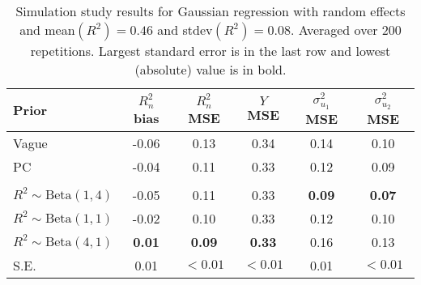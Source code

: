 \documentclass[12pt]{article}
\begin{document}
\begin{table}
\centering
    \begin{tabular}{l|ccccc}
        Prior & $R^2_n$ bias & $R^2_n$ MSE& $Y$ MSE &  $\sigma^2_{u_1}$ MSE & $\sigma^2_{u_2}$ MSE \\\hline

        Vague &  -0.06 &0.13 &0.34 &0.14 &0.10 \\
        PC &-0.04 &0.11 &0.33 &0.12 &0.09  \\
        &\vspace{-10pt}\\
        $R^2\sim\mbox{Beta}(1,4)$ &-0.05 &0.11 &0.33 &{\bf 0.09} &{\bf 0.07} \\
        $R^2\sim\mbox{Beta}(1,1)$&-0.02 &0.10 &0.33 &0.12 &0.10 \\
        $R^2\sim\mbox{Beta}(4,1)$ &{\bf 0.01} &{\bf 0.09} &{\bf 0.33} &0.16 &0.13    \\\hline
        S.E. & 0.01 & $<0.01$ & $<0.01$ & 0.01 & $<0.01$
    \end{tabular}
    \caption{Simulation study results for Gaussian regression with random effects and mean$(R^2)=0.46$ and stdev$(R^2)=0.08$. Averaged over 200 repetitions. Largest standard error is in the last row and lowest (absolute) value is in bold.}
    \label{tab:GaussSim1}
\end{table}

\begin{comment}
\begin{table}
\centering
    \begin{tabular}{l|ccccc}
        Prior & $R^2_n$ bias & $R^2_n$ MSE& $Y$ MSE &  $\sigma^2_\alpha$ MSE & $\sigma^2_\gamma$ MSE \\\hline

        Vague &  -0.060 &0.127 &0.337 &0.138 &0.100 \\
        PCP &-0.038 &0.109 &0.332 &0.117 &0.089  \\
        &\vspace{-10pt}\\
        $R^2\sim\mbox{Beta}(1,4)$ &-0.051 &0.110 &0.333 &{\bf 0.093} &{\bf 0.072} \\
        $R^2\sim\mbox{Beta}(1,1)$&-0.022 &0.100 &0.331 &0.122 &0.098  \\
        $R^2\sim\mbox{Beta}(4,1)$ &{\bf 0.008} &{\bf 0.089} &{\bf 0.329} &0.157 &0.130     \\\hline
        S.E. & 0.007 & 0.004 & 0.002 & 0.005 & 0.004
    \end{tabular}
    \caption{Simulation study results for Gaussian regression with random effects and mean$(R^2)=0.46$ and stdev$(R^2)=0.08$. Averaged over 200 repetitions. Largest standard error is in the last row and lowest (absolute) value is in bold.}
    \label{tab:GaussSim1}
\end{table}
\end{comment}
\end{document}
